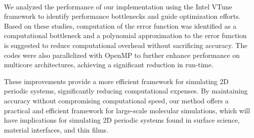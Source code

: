 \documentclass[11pt, a4paper, oneside]{Thesis} %
\begin{document}
{We analyzed the performance of our implementation using the Intel\textsuperscript{\textregistered} VTune framework to identify performance bottlenecks and guide optimization efforts. Based on these studies, computation of the error function was identified as a computational bottleneck and a polynomial approximation to the error function is suggested to reduce computational overhead without sacrificing accuracy. The codes were also parallelized with OpenMP to further enhance performance on multicore architectures, achieving a significant reduction in run-time.

These improvements provide a more efficient framework for simulating 2D periodic systems, significantly reducing computational expenses. By maintaining accuracy without compromising computational speed, our method offers a practical and efficient framework for large-scale molecular simulations, which will have implications for simulating 2D periodic systems found in surface science, material interfaces, and thin films.
}


\clearpage %
\clearpage %
\end{document}
